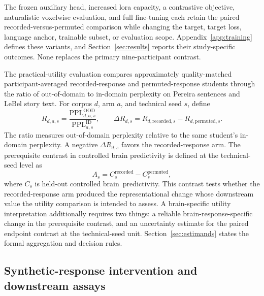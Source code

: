 The frozen auxiliary head, increased \ac{lora} capacity, a contrastive objective, naturalistic voxelwise evaluation, and full fine-tuning each retain the paired recorded-versus-permuted comparison while changing the target, target loss, language anchor, trainable subset, or evaluation scope.
Appendix~\ref{app:training} defines these variants, and Section~\ref{sec:results} reports their study-specific outcomes.
None replaces the primary nine-participant contrast.

The practical-utility evaluation compares approximately quality-matched participant-averaged recorded-response and permuted-response students through the ratio of out-of-domain to in-domain perplexity on Pereira sentences and LeBel story text.
For corpus \(d\), arm \(a\), and technical seed \(s\), define
\begin{equation}
R_{d,a,s}
=
\frac{
\mathrm{PPL}^{\mathrm{OOD}}_{d,a,s}
}{
\mathrm{PPL}^{\mathrm{ID}}_{a,s}
},
\qquad
\Delta R_{d,s}
=
R_{d,\mathrm{recorded},s}
-
R_{d,\mathrm{permuted},s}.
\label{eq:practical-utility-ratio}
\end{equation}
 The ratio measures out-of-domain perplexity relative to the same student's in-domain perplexity.
A negative \(\Delta R_{d,s}\) favors the recorded-response arm.
The prerequisite contrast in controlled brain predictivity is defined at the technical-seed level as
\begin{equation}
A_s
=
C_s^{\mathrm{recorded}}
-
C_s^{\mathrm{permuted}},
\label{eq:practical-utility-prerequisite}
\end{equation}
where \(C_s\) is held-out controlled brain~\mbox{predictivity}.
This contrast tests whether the recorded-response arm produced the representational change whose downstream value the utility comparison is intended to assess.
A brain-specific utility interpretation additionally requires two things: a reliable brain-response-specific change in the prerequisite contrast, and an uncertainty estimate for the paired endpoint contrast at the technical-seed unit.
Section~\ref{sec:estimands} states the formal aggregation and decision rules.

\subsection{Synthetic-response intervention and downstream assays}
\label{sec:synthetic-intervention}

